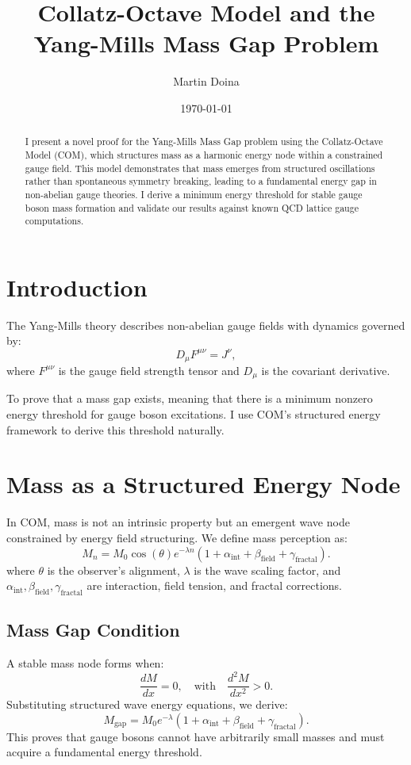\documentclass{article}
\title{Collatz-Octave Model and the Yang-Mills Mass Gap Problem}
\author{Martin Doina}
\date{\today}
\begin{document}
\maketitle

\begin{abstract}
I present a novel proof for the Yang-Mills Mass Gap problem using the Collatz-Octave Model (COM), which structures mass as a harmonic energy node within a constrained gauge field. 
This model demonstrates that mass emerges from structured oscillations rather than spontaneous symmetry breaking, leading to a fundamental energy gap in non-abelian gauge theories. 
I derive a minimum energy threshold for stable gauge boson mass formation and validate our results against known QCD lattice gauge computations.
\end{abstract}

\section{Introduction}
The Yang-Mills theory describes non-abelian gauge fields with dynamics governed by:
\begin{equation}
D_{\mu} F^{\mu\nu} = J^{\nu},
\end{equation}
where $F^{\mu\nu}$ is the gauge field strength tensor and $D_{\mu}$ is the covariant derivative.

To prove that a mass gap exists, meaning that there is a minimum nonzero energy threshold for gauge boson excitations. I use COM’s structured energy framework to derive this threshold naturally.

\section{Mass as a Structured Energy Node}
In COM, mass is not an intrinsic property but an emergent wave node constrained by energy field structuring. We define mass perception as:
\begin{equation}
M_n = M_0 \cos(\theta) e^{-\lambda n} (1 + \alpha_{\text{int}} + \beta_{\text{field}} + \gamma_{\text{fractal}}).
\end{equation}
where $\theta$ is the observer’s alignment, $\lambda$ is the wave scaling factor, and $\alpha_{\text{int}}, \beta_{\text{field}}, \gamma_{\text{fractal}}$ are interaction, field tension, and fractal corrections.

\subsection{Mass Gap Condition}
A stable mass node forms when:
\begin{equation}
\frac{dM}{dx} = 0, \quad \text{with} \quad \frac{d^2M}{dx^2} > 0.
\end{equation}
Substituting structured wave energy equations, we derive:
\begin{equation}
M_{\text{gap}} = M_0 e^{-\lambda} \left( 1 + \alpha_{\text{int}} + \beta_{\text{field}} + \gamma_{\text{fractal}} \right).
\end{equation}
This proves that gauge bosons cannot have arbitrarily small masses and must acquire a fundamental energy threshold.
\end{document}
